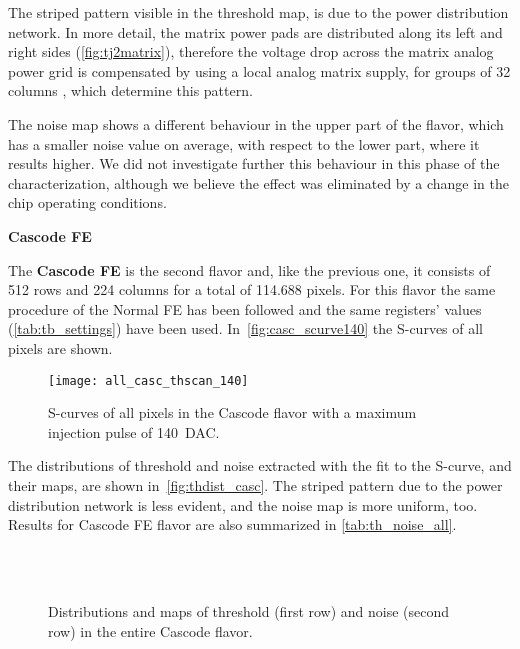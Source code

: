 The striped pattern visible in the threshold map, is due to the power distribution network.
In more detail, the matrix power pads are distributed along its left and right sides (\autoref{fig:tj2matrix}), therefore the voltage drop across the matrix analog power grid is compensated by using a local analog matrix supply, for groups of 32 columns \cite{Moustakas:2021gjr}, which determine this pattern.

The noise map shows a different behaviour in the upper part of the flavor, which has a smaller noise value on average, with respect to the lower part, where it results higher. We did not investigate further this behaviour in this phase of the characterization, although we believe the effect was eliminated by a change in the chip operating conditions.


\medskip
\begin{description}
\item \textbf{Cascode FE}
\end{description}

The \textbf{Cascode FE} is the second flavor and, like the previous one, it consists of 512 rows and 224 columns for a total of 114.688 pixels. For this flavor the same procedure of the Normal FE has been followed and the same registers' values (\autoref{tab:tb_settings}) have been used.
In~\autoref{fig:casc_scurve140} the S-curves of all pixels are shown.

\begin{figure}[h!]
\centering
\texttt{[image: all\_casc\_thscan\_140]}
\caption{S-curves of all pixels in the Cascode flavor with a maximum injection pulse of \SI{140}{DAC}.}
\label{fig:casc_scurve140}
\end{figure}

The distributions of threshold and noise extracted with the fit to the S-curve, and their maps, are shown in~\autoref{fig:thdist_casc}. 
The striped pattern due to the power distribution network is less evident, and the noise map is more uniform, too. Results for Cascode FE flavor are also summarized in \autoref{tab:th_noise_all}.


\begin{figure}[h!]
\centering
{}\quad
{}\\
\quad
{}\\
\caption{Distributions and maps of threshold (first row) and noise (second row) in the entire Cascode flavor.}
\label{fig:thdist_casc}
\end{figure}


